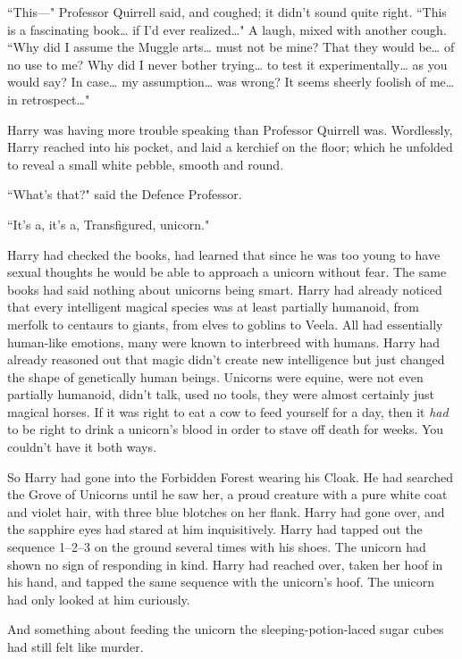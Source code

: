 ``This—" Professor Quirrell said, and coughed; it didn't sound quite right. ``This is a fascinating book{\ldots} if I'd ever realized{\ldots}" A laugh, mixed with another cough. ``Why did I assume the Muggle arts{\ldots} must not be mine? That they would be{\ldots} of no use to me? Why did I never bother trying{\ldots} to test it experimentally{\ldots} as you would say? In case{\ldots} my assumption{\ldots} was wrong? It seems sheerly foolish of me{\ldots} in retrospect{\ldots}"

Harry was having more trouble speaking than Professor Quirrell was. Wordlessly, Harry reached into his pocket, and laid a kerchief on the floor; which he unfolded to reveal a small white pebble, smooth and round.

``What's that?" said the Defence Professor.

``It's a, it's a, Transfigured, unicorn."

Harry had checked the books, had learned that since he was too young to have sexual thoughts he would be able to approach a unicorn without fear. The same books had said nothing about unicorns being smart. Harry had already noticed that every intelligent magical species was at least partially humanoid, from merfolk to centaurs to giants, from elves to goblins to Veela. All had essentially human-like emotions, many were known to interbreed with humans. Harry had already reasoned out that magic didn't create new intelligence but just changed the shape of genetically human beings. Unicorns were equine, were not even partially humanoid, didn't talk, used no tools, they were almost certainly just magical horses. If it was right to eat a cow to feed yourself for a day, then it \emph{had} to be right to drink a unicorn's blood in order to stave off death for weeks. You couldn't have it both ways.

So Harry had gone into the Forbidden Forest wearing his Cloak. He had searched the Grove of Unicorns until he saw her, a proud creature with a pure white coat and violet hair, with three blue blotches on her flank. Harry had gone over, and the sapphire eyes had stared at him inquisitively. Harry had tapped out the sequence 1--2--3 on the ground several times with his shoes. The unicorn had shown no sign of responding in kind. Harry had reached over, taken her hoof in his hand, and tapped the same sequence with the unicorn's hoof. The unicorn had only looked at him curiously.

And something about feeding the unicorn the sleeping-potion-laced sugar cubes had still felt like murder.

